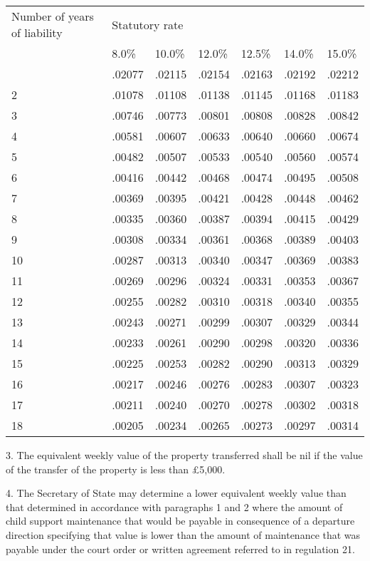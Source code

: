 \documentclass[a4paper]{article}
\begin{document}
\noindent
\begin{longtable}{p{74.30011pt} lll lll}
\hline
Number of years of liability&\multicolumn{6}{l}{Statutory rate}\\
& 8.0\%&10.0\%&12.0\%&12.5\%&14.0\%&15.0\%\\
\hline
\endhead
\hline
\endlastfoot
1&.02077&.02115&.02154&.02163&.02192&.02212\\
2&.01078&.01108&.01138&.01145&.01168&.01183\\
3&.00746&.00773&.00801&.00808&.00828&.00842\\
4&.00581&.00607&.00633&.00640&.00660&.00674\\
5&.00482&.00507&.00533&.00540&.00560&.00574\\
6&.00416&.00442&.00468&.00474&.00495&.00508\\
7&.00369&.00395&.00421&.00428&.00448&.00462\\
8&.00335&.00360&.00387&.00394&.00415&.00429\\
9&.00308&.00334&.00361&.00368&.00389&.00403\\
10&.00287&.00313&.00340&.00347&.00369&.00383\\
11&.00269&.00296&.00324&.00331&.00353&.00367\\
12&.00255&.00282&.00310&.00318&.00340&.00355\\
13&.00243&.00271&.00299&.00307&.00329&.00344\\
14&.00233&.00261&.00290&.00298&.00320&.00336\\
15&.00225&.00253&.00282&.00290&.00313&.00329\\
16&.00217&.00246&.00276&.00283&.00307&.00323\\
17&.00211&.00240&.00270&.00278&.00302&.00318\\
18&.00205&.00234&.00265&.00273&.00297&.00314\\
\end{longtable}


\medskip

3.
The equivalent weekly value of the property transferred shall be nil if the
value of the transfer of the property is less than £5,000.

\medskip

4. The Secretary of State may determine a lower equivalent weekly value than
that determined in accordance with paragraphs 1 and 2 where the amount of child
support maintenance that would be payable in consequence of a departure
direction specifying that value is lower than the amount of maintenance that was
payable under the court order or written agreement referred to in regulation 21.
\end{document}
